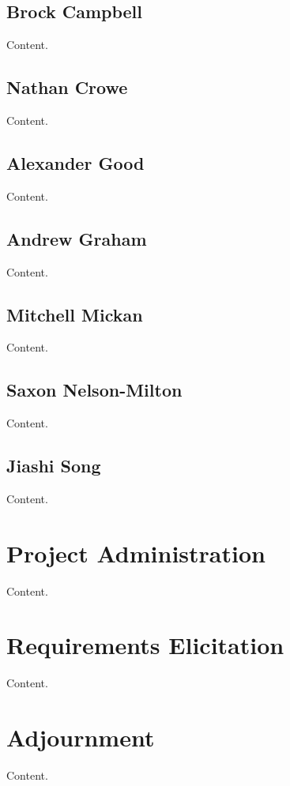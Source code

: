 \documentclass[11pt, a4paper]{article}
\begin{document}
	\subsection{Brock Campbell}
		Content.
	\subsection{Nathan Crowe}
		Content.
	\subsection{Alexander Good}
		Content.
	\subsection{Andrew Graham}
		Content.
	\subsection{Mitchell Mickan}
		Content.
	\subsection{Saxon Nelson-Milton}
		Content.
	\subsection{Jiashi Song}
		Content.
\section{Project Administration}
	Content.
\section{Requirements Elicitation}
	Content.
\section{Adjournment}
	Content.
\end{document}
